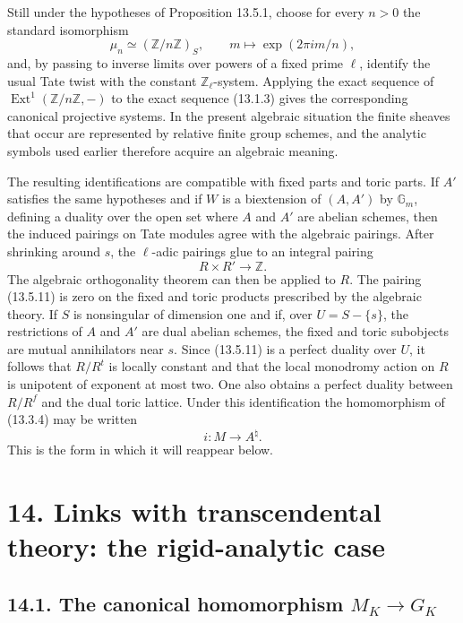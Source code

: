 \documentclass[12pt]{article}
\providecommand{\Ext}{\operatorname{Ext}}
\providecommand{\Z}{\mathbb Z}
\providecommand{\Gm}{\mathbb G_m}
\begin{document}
Still under the hypotheses of Proposition 13.5.1, choose for every $n>0$ the standard isomorphism
\[
        \mu_n\simeq(\Z/n\Z)_S,
        \qquad m\longmapsto\exp(2\pi i m/n),
\]
and, by passing to inverse limits over powers of a fixed prime $\ell$, identify the usual Tate twist with the constant $\Z_\ell$-system.  Applying the exact sequence of $\Ext^1(\Z/n\Z,-)$ to the exact sequence (13.1.3) gives the corresponding canonical projective systems.  In the present algebraic situation the finite sheaves that occur are represented by relative finite group schemes, and the analytic symbols used earlier therefore acquire an algebraic meaning.

The resulting identifications are compatible with fixed parts and toric parts.  If $A'$ satisfies the same hypotheses and if $W$ is a biextension of $(A,A')$ by $\Gm$, defining a duality over the open set where $A$ and $A'$ are abelian schemes, then the induced pairings on Tate modules agree with the algebraic pairings.  After shrinking around $s$, the $\ell$-adic pairings glue to an integral pairing
\begin{equation}\tag{13.5.11}
        R\times R'\longrightarrow \Z .
\end{equation}
The algebraic orthogonality theorem can then be applied to $R$.  The pairing (13.5.11) is zero on the fixed and toric products prescribed by the algebraic theory.  If $S$ is nonsingular of dimension one and if, over $U=S-\{s\}$, the restrictions of $A$ and $A'$ are dual abelian schemes, the fixed and toric subobjects are mutual annihilators near $s$.  Since (13.5.11) is a perfect duality over $U$, it follows that $R/R^t$ is locally constant and that the local monodromy action on $R$ is unipotent of exponent at most two.  One also obtains a perfect duality between $R/R^f$ and the dual toric lattice.  Under this identification the homomorphism of (13.3.4) may be written
\begin{equation}\tag{13.5.13}
        i:M\longrightarrow A^{\natural}.
\end{equation}
This is the form in which it will reappear below.

\section*{14. Links with transcendental theory: the rigid-analytic case}
\subsection*{14.1. The canonical homomorphism $M_K\to G_K$}
\end{document}
